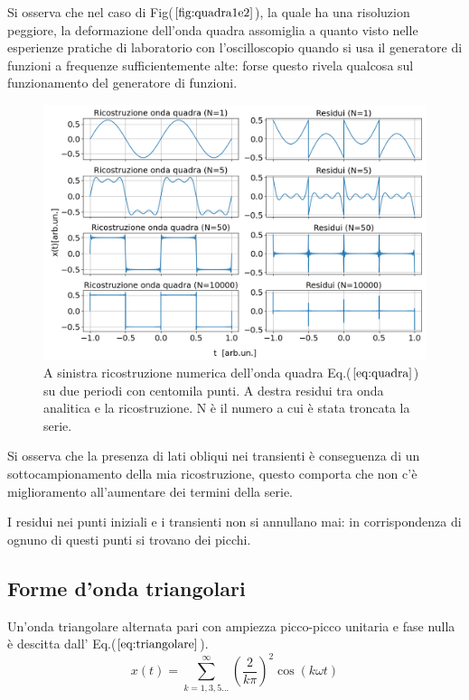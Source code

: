 \documentclass{article}
\begin{document}
        \noindent Si osserva che nel caso di Fig($\ref{fig:quadra1e2}$),
        la quale ha una risoluzion  peggiore, la deformazione dell'onda quadra assomiglia a quanto visto nelle esperienze 
        pratiche di laboratorio con l'oscilloscopio quando si usa il generatore di funzioni a
        frequenze sufficientemente alte: forse questo rivela qualcosa sul funzionamento del generatore
        di funzioni.\\

        \begin{figure}[htbp]
            \centering
            \includegraphics[width=1\textwidth]{fousquarewave1e5.png} %
            \caption{A sinistra ricostruzione numerica dell'onda quadra Eq.($\ref{eq:quadra}$) su
                    due periodi con centomila punti.
                    A destra residui tra onda analitica e la ricostruzione.
                    N è il numero a cui è stata troncata la serie.}            \label{fig:quadra1e5}
        \end{figure}  
        
        
        \noindent Si osserva che la presenza di lati obliqui nei transienti è conseguenza di un sottocampionamento
        della mia ricostruzione, questo comporta che non c'è miglioramento all'aumentare dei termini 
        della serie.

        \noindent I residui nei punti iniziali e i transienti non si annullano mai: in corrispondenza di ognuno di
        questi punti si trovano dei picchi. \newline \newline


    \subsection{Forme d'onda triangolari}
        Un'onda triangolare alternata pari con ampiezza picco-picco unitaria
        e fase nulla è descitta dall' Eq.($\ref{eq:triangolare}$).
        \begin{equation}
            x(t) = \sum_{k=1,3,5...}^{\infty} \left(\frac{2}{k\pi}\right)^{2}\cos\left(k\omega t\right)
            \label{eq:triangolare}
        \end{equation}
\end{document}
